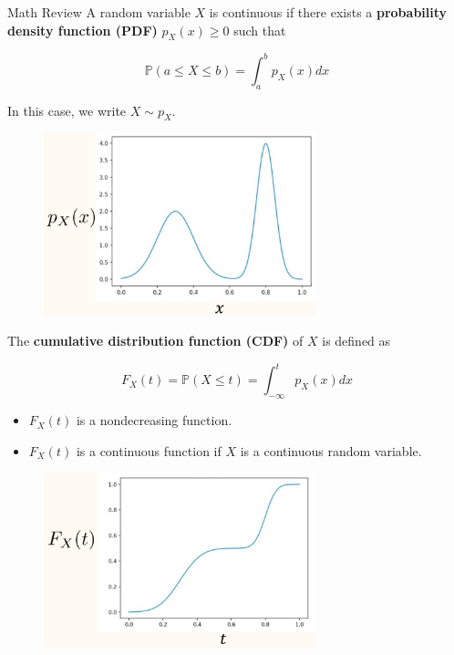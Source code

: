 \begin{frame}[allowframebreaks]

\begin{myconceptblock}{10.3}{Math Review}
    A random variable $X$ is continuous if there exists a \textbf{probability density function (PDF)} $p_{X}(x) \geq 0$ such that

    $$
    \mathbb{P}(a \leq X \leq b)=\int_{a}^{b} p_{X}(x) d x
    $$

    In this case, we write $X \sim p_{X}$.

    \begin{figure}[H]
        \centering
        \includegraphics[width=0.7\textwidth]{.././assets/10.3.png}
    \end{figure}

    \par\noindent\textcolor{gray}{\hdashrule{\textwidth}{0.4pt}{1pt 2pt}}

    The \textbf{cumulative distribution function (CDF)} of $X$ is defined as

    $$
    F_{X}(t)=\mathbb{P}(X \leq t)=\int_{-\infty}^{t} p_{X}(x) d x
    $$

    \begin{itemize}
        \item $F_{X}(t)$ is a nondecreasing function.\\
        \item $F_{X}(t)$ is a continuous function if $X$ is a continuous random variable.
    \end{itemize}

    \begin{figure}[H]
        \centering
        \includegraphics[width=0.7\textwidth]{.././assets/10.4.png}
    \end{figure}
\end{myconceptblock}

\end{frame}

